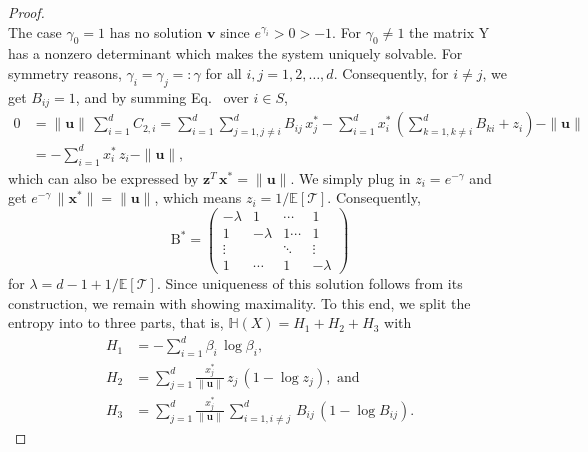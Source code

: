 \documentclass[smallextended]{svjour3}
\makeatletter
\renewcommand*{\eqref}[1]{%
  \hyperref[{#1}]{\textup{\tagform@{\ref*{#1}}}}%
}
\renewcommand{\tens}[1]{\mathrm{#1}}
\renewcommand{\vec}[1]{\mathbf{#1}}
\newcommand{\E}{\mathbb{E}}
\newcommand{\TT}{\mathcal{T}}
\renewcommand{\H}{\mathbb{H}}
\newcommand{\suml}{\sum\limits}
\newcommand{\vnorms}[1]{\|#1\|}
\newcommand{\ie}{that is}
\providecommand{\DIFaddtex}[1]{{\protect\color{blue}\uwave{#1}}} %
\providecommand{\DIFdeltex}[1]{{\protect\color{red}\sout{#1}}}                      %
\providecommand{\DIFaddbegin}{} %
\providecommand{\DIFaddend}{} %
\providecommand{\DIFdelbegin}{} %
\providecommand{\DIFdelend}{} %
\providecommand{\DIFadd}[1]{\texorpdfstring{\DIFaddtex{#1}}{#1}} %
\providecommand{\DIFdel}[1]{\texorpdfstring{\DIFdeltex{#1}}{}} %
\newcommand{\DIFscaledelfig}{0.5}
\newlength{\DIFdelgraphicswidth} %
\newlength{\DIFdelgraphicsheight} %
\newcommand{\DIFaddincludegraphics}[2][]{{\color{blue}\fbox{\DIFOincludegraphics[#1]{#2}}}} %
\newcommand{\DIFdelincludegraphics}[2][]{%
\sbox{\DIFdelgraphicsbox}{\DIFOincludegraphics[#1]{#2}}%
\settoboxwidth{\DIFdelgraphicswidth}{\DIFdelgraphicsbox} %
\settoboxtotalheight{\DIFdelgraphicsheight}{\DIFdelgraphicsbox} %
\scalebox{\DIFscaledelfig}{%
\parbox[b]{\DIFdelgraphicswidth}{\usebox{\DIFdelgraphicsbox}\\[-\baselineskip] \rule{\DIFdelgraphicswidth}{0em}}\llap{\resizebox{\DIFdelgraphicswidth}{\DIFdelgraphicsheight}{%
\setlength{\unitlength}{\DIFdelgraphicswidth}%
\begin{picture}(1,1)%
\thicklines\linethickness{2pt} %
{\color[rgb]{1,0,0}\put(0,0){\framebox(1,1){}}}%
{\color[rgb]{1,0,0}\put(0,0){\line( 1,1){1}}}%
{\color[rgb]{1,0,0}\put(0,1){\line(1,-1){1}}}%
\end{picture}%
}\hspace*{3pt}}} %
} %
\DeclareRobustCommand{\DIFaddbegin}{\DIFOaddbegin \let\includegraphics\DIFaddincludegraphics} %
\DeclareRobustCommand{\DIFaddend}{\DIFOaddend \let\includegraphics\DIFOincludegraphics} %
\DeclareRobustCommand{\DIFdelbegin}{\DIFOdelbegin \let\includegraphics\DIFdelincludegraphics} %
\DeclareRobustCommand{\DIFdelend}{\DIFOaddend \let\includegraphics\DIFOincludegraphics} %
\makeatother
\begin{document}
\begin{proof}
\begin{equation}
		\end{equation}
		The case $\gamma_0=1$ has no solution $\vec{v}$ since $e^{\gamma_i}>0>-1$.
		For $\gamma_0\neq 1$ the matrix $\tens{Y}$ has a nonzero determinant which makes the system uniquely solvable.
		For symmetry reasons, $\gamma_i=\gamma_j=:\gamma$ for all $i,j=1,2,\ldots,d$.
		Consequently, for $i\neq j$, we get $B_{ij}=1$, and by summing Eq.~\eqref{eqn:constraint_C2} over $i\in S$,
		\begin{equation}
		\begin{aligned}
			0 &= \vnorms{\vec{u}}\,\suml_{i=1}^d C_{2,i} = \suml_{i=1}^d \suml_{j=1,j\neq i}^d B_{ij}\,x_j^\ast - \suml_{i=1}^d x_i^\ast\,\left(\suml_{k=1,k\neq i}^d B_{ki}+z_i\right) - \vnorms{\vec{u}}\\
			&= -\suml_{i=1}^d x_i^\ast\,z_i - \vnorms{\vec{u}},		
		\end{aligned}
		\end{equation}
		which can also be expressed by $\vec{z}^T\,\vec{x}^\ast = \vnorms{\vec{u}}$.
		We simply plug in $z_i=e^{-\gamma}$ and get \DIFdelbegin \DIFdel{$e^{-\gamma}\,\vnorms{\vec{x}^\ast} = \|\vec{u}\|$}\DIFdelend \DIFaddbegin \DIFadd{$e^{-\gamma}\,\vnorms{\vec{x}^\ast} = \vnorms{\vec{u}}$}\DIFaddend , which means $z_i = 1/\E\left[\TT\right]$.
		Consequently,
		\begin{equation}
			\tens{B}^\ast = \begin{pmatrix}
									-\lambda & 1 & \cdots & 1\\
									1 & -\lambda & 1 \cdots & 1 \\
									\vdots & & \ddots & \vdots\\
									1 & \cdots & 1 & -\lambda
							\end{pmatrix}
		\end{equation}
		for $\lambda=d-1+1/\E\left[\TT\right]$.
		Since uniqueness of this solution follows from its construction, we remain with showing maximality.
		To this end, we split the entropy into to three parts, \ie, $\H(X) = H_1 + H_2 + H_3$ with
		\begin{equation}
			\begin{aligned}
				H_1 &= -\suml_{i=1}^d\beta_i\,\log\beta_i,\\
				H_2 &= \suml_{j=1}^d \frac{x^\ast_j}{\vnorms{\vec{u}}}\,z_j\,(1-\log z_j), \text{ and}\\
				H_3 &= \suml_{j=1}^d \frac{x^\ast_j}{\vnorms{\vec{u}}}\,\suml_{i=1,i\neq j}^d \,B_{ij}\,(1-\log B_{ij}).
			\end{aligned}
		\end{equation}

\end{proof}
\end{document}
